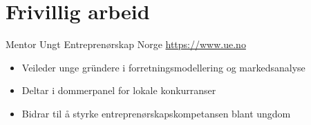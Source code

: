 \documentclass[a4paper, serif, 10pt]{moderncv}
\begin{document}
\section{Frivillig arbeid}

        {Mentor}
        {Ungt Entreprenørskap Norge}
        {\url{https://www.ue.no}}
        {}
        {\begin{itemize}
\item Veileder unge gründere i forretningsmodellering og markedsanalyse
\item Deltar i dommerpanel for lokale konkurranser
\item Bidrar til å styrke entreprenørskapskompetansen blant ungdom
\end{itemize}}
    
\end{document}

